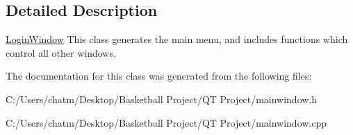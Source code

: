 \subsection{Detailed Description}
\mbox{\hyperlink{class_login_window}{Login\+Window}} This class generates the main menu, and includes functions which control all other windows. 

The documentation for this class was generated from the following files\+:\begin{DoxyCompactItemize}
\item 
C\+:/\+Users/chatm/\+Desktop/\+Basketball Project/\+Q\+T Project/mainwindow.\+h\item 
C\+:/\+Users/chatm/\+Desktop/\+Basketball Project/\+Q\+T Project/mainwindow.\+cpp\end{DoxyCompactItemize}
